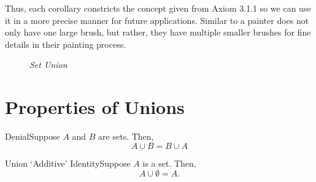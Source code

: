 Thus, each corollary constricts the concept given from Axiom 3.1.1 so we can use it in a more precise manner for future applications. Similar to a painter does not only have one large brush, but rather, they have multiple smaller brushes for fine details in their painting process.

\begin{figure}[htbp]
    \centering
    \caption{\textit{Set Union}}
\end{figure}
\newpage

\renewcommand{\theenumi}{\arabic{enumi}}
\renewcommand{\labelenumi}{\theenumi.}
\section{Properties of Unions}

\vspace{0.3cm}

\begin{exercise}
    {Denial}Suppose \(A\) and \(B\) are sets. Then, \[A \cup B = B \cup A\]
\end{exercise}


\begin{exercise}
    {Union `Additive' Identity}Suppose \(A\) is a set. Then, 
    \[
        A \cup \emptyset = A.
    \]
\end{exercise}


